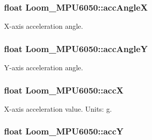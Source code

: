 \subsubsection[{\texorpdfstring{acc\+AngleX}{accAngleX}}]{\setlength{\rightskip}{0pt plus 5cm}float Loom\+\_\+\+M\+P\+U6050\+::acc\+AngleX\hspace{0.3cm}{\ttfamily [protected]}}\hypertarget{class_loom___m_p_u6050_ab8ccba95253cd13a7505927d07a81abc}{}\label{class_loom___m_p_u6050_ab8ccba95253cd13a7505927d07a81abc}


X-\/axis acceleration angle. 

\subsubsection[{\texorpdfstring{acc\+AngleY}{accAngleY}}]{\setlength{\rightskip}{0pt plus 5cm}float Loom\+\_\+\+M\+P\+U6050\+::acc\+AngleY\hspace{0.3cm}{\ttfamily [protected]}}\hypertarget{class_loom___m_p_u6050_a54de31e46d5c353b521483bcb88832c2}{}\label{class_loom___m_p_u6050_a54de31e46d5c353b521483bcb88832c2}


Y-\/axis acceleration angle. 

\subsubsection[{\texorpdfstring{accX}{accX}}]{\setlength{\rightskip}{0pt plus 5cm}float Loom\+\_\+\+M\+P\+U6050\+::accX\hspace{0.3cm}{\ttfamily [protected]}}\hypertarget{class_loom___m_p_u6050_abe1855f17309051bcecddf084a7f2a95}{}\label{class_loom___m_p_u6050_abe1855f17309051bcecddf084a7f2a95}


X-\/axis acceleration value. Units\+: g. 

\subsubsection[{\texorpdfstring{accY}{accY}}]{\setlength{\rightskip}{0pt plus 5cm}float Loom\+\_\+\+M\+P\+U6050\+::accY\hspace{0.3cm}{\ttfamily [protected]}}\hypertarget{class_loom___m_p_u6050_a12e89f1a6d8e9564600e6e85375abca9}{}\label{class_loom___m_p_u6050_a12e89f1a6d8e9564600e6e85375abca9}


